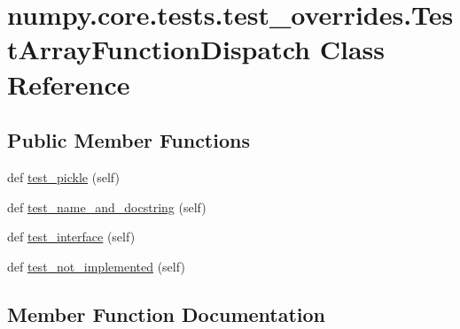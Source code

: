 \hypertarget{classnumpy_1_1core_1_1tests_1_1test__overrides_1_1TestArrayFunctionDispatch}{}\section{numpy.\+core.\+tests.\+test\+\_\+overrides.\+Test\+Array\+Function\+Dispatch Class Reference}
\label{classnumpy_1_1core_1_1tests_1_1test__overrides_1_1TestArrayFunctionDispatch}
\subsection*{Public Member Functions}
\begin{DoxyCompactItemize}
\item 
def \hyperlink{classnumpy_1_1core_1_1tests_1_1test__overrides_1_1TestArrayFunctionDispatch_ac3090e7a47c3bb2ae9b234714085d03e}{test\+\_\+pickle} (self)
\item 
def \hyperlink{classnumpy_1_1core_1_1tests_1_1test__overrides_1_1TestArrayFunctionDispatch_a07a7426764a3344ce2905017856c756d}{test\+\_\+name\+\_\+and\+\_\+docstring} (self)
\item 
def \hyperlink{classnumpy_1_1core_1_1tests_1_1test__overrides_1_1TestArrayFunctionDispatch_a6f81a8d713573aef7dee4f0397ec35cc}{test\+\_\+interface} (self)
\item 
def \hyperlink{classnumpy_1_1core_1_1tests_1_1test__overrides_1_1TestArrayFunctionDispatch_af90e35d1b749056559c650022ca18348}{test\+\_\+not\+\_\+implemented} (self)
\end{DoxyCompactItemize}


\subsection{Member Function Documentation}
\mbox{\label{classnumpy_1_1core_1_1tests_1_1test__overrides_1_1TestArrayFunctionDispatch_a6f81a8d713573aef7dee4f0397ec35cc}} 
